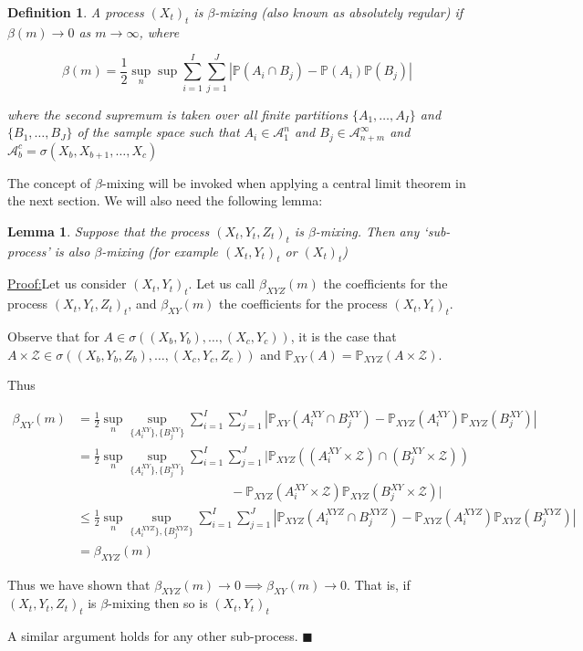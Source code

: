 \documentclass[12pt]{article}
\newtheorem{definition}{Definition}
\newtheorem{lemma}{Lemma}
\newenvironment{claimproof}[1]{\par\noindent\underline{Proof:}\space#1}{\hfill $\blacksquare$}
\numberwithin{claim}{section}
\numberwithin{lemma}{section}
\numberwithin{theorem}{section}
\begin{document}
\begin{definition}
A process $(X_t)_{t}$ is \emph{$\beta$-mixing} (also known as \emph{absolutely regular}) if $\beta(m) \longrightarrow 0$ as $m\longrightarrow \infty$, where

\[ \beta(m) = \frac{1}{2} \sup_n \sup \sum_{i=1}^I \sum_{j=1}^J | \mathbb{P}(A_i \cap B_j) - \mathbb{P}(A_i)\mathbb{P}(B_j)| \]

where the second supremum is taken  over all finite partitions $\{A_1,\ldots, A_I \}$ and  $\{B_1,\ldots, B_J\}$ of the sample space such that $A_i \in \mathcal{A}_1^n$ and $B_j \in \mathcal{A}_{n+m}^\infty$ and $\mathcal{A}_b^c = \sigma(X_b,X_{b+1},\ldots,X_{c})$
\end{definition}

The concept of $\beta$-mixing will be invoked when applying a central limit theorem in the next section. We will also need the following lemma:

\begin{lemma}\label{lemma:beta}
Suppose that the process $(X_t,Y_t,Z_t)_t$ is $\beta$-mixing. Then any `sub-process' is also $\beta$-mixing (for example $(X_t,Y_t)_t$ or $(X_t)_t$)
\end{lemma}

\begin{claimproof} Let us consider $(X_t,Y_t)_t$.
Let us call $\beta_{XYZ}(m)$ the coefficients for the process $(X_t,Y_t,Z_t)_t$, and $\beta_{XY}(m)$ the coefficients for the process $(X_t,Y_t)_t$. 

Observe that for $A \in \sigma((X_b,Y_b),\ldots, (X_c,Y_c))$, it is the case that $A \times \mathcal{Z} \in \sigma((X_b,Y_b,Z_b),\ldots, (X_c,Y_c,Z_c))$ and $\mathbb{P}_{XY}(A) = \mathbb{P}_{XYZ}(A\times \mathcal{Z})$.

Thus

\begin{align*}
\beta_{XY}(m) &= \frac{1}{2} \sup_n \sup_{ \{A_i^{XY} \}, \{B_j^{XY} \} } \sum_{i=1}^I \sum_{j=1}^J | \mathbb{P}_{XY}(A_i^{XY} \cap B_j^{XY}) - \mathbb{P}_{XYZ}(A_i^{XY})\mathbb{P}_{XYZ}(B_j^{XY})| \\
&= \frac{1}{2} \sup_n \sup_{ \{A_i^{XY} \}, \{B_j^{XY} \} } \sum_{i=1}^I \sum_{j=1}^J | \mathbb{P}_{XYZ}((A_i^{XY}\times \mathcal{Z}) \cap (B_j^{XY} \times \mathcal{Z})) \\& \quad \quad\quad \quad \quad \quad\quad \quad \quad \quad\quad \quad- \mathbb{P}_{XYZ}(A_i^{XY}\times \mathcal{Z})\mathbb{P}_{XYZ}(B_j^{XY} \times \mathcal{Z})| \\
& \leq \frac{1}{2} \sup_n \sup_{ \{A_i^{XYZ} \}, \{B_j^{XYZ} \} } \sum_{i=1}^I \sum_{j=1}^J | \mathbb{P}_{XYZ}(A_i^{XYZ} \cap B_j^{XYZ}) - \mathbb{P}_{XYZ}(A_i^{XYZ})\mathbb{P}_{XYZ}(B_j^{XYZ})| \\
& = \beta_{XYZ}(m)
\end{align*}

Thus we have shown that  $\beta_{XYZ}(m) \longrightarrow 0 \implies \beta_{XY}(m) \longrightarrow 0$. That is, if  $(X_t,Y_t,Z_t)_t$ is $\beta$-mixing then so is  $(X_t,Y_t)_t$ 

A similar argument holds for any other sub-process.
\end{claimproof}
\end{document}
